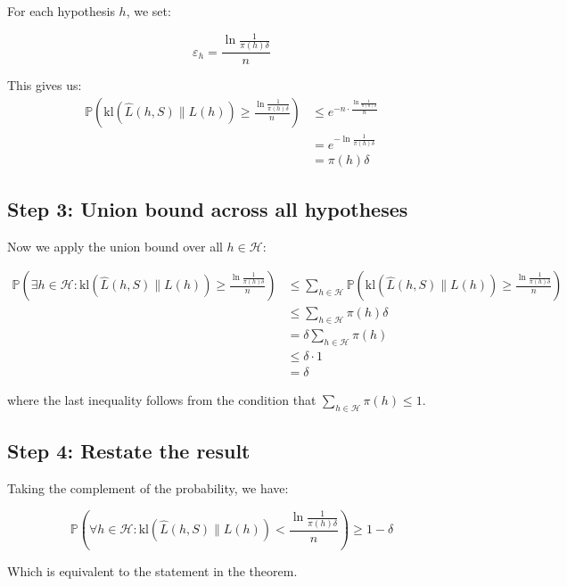 \documentclass{article}
\begin{document}
For each hypothesis $h$, we set:

\begin{equation}
\varepsilon_h = \frac{\ln \frac{1}{\pi(h)\delta}}{n}
\end{equation}

This gives us:
\begin{align}
\mathbb{P}\left(\text{kl}(\hat{L}(h,S)\|L(h)) \geq \frac{\ln \frac{1}{\pi(h)\delta}}{n}\right) &\leq e^{-n \cdot \frac{\ln \frac{1}{\pi(h)\delta}}{n}} \\
&= e^{-\ln \frac{1}{\pi(h)\delta}} \\
&= \pi(h)\delta
\end{align}

\subsection{Step 3: Union bound across all hypotheses}

Now we apply the union bound over all $h \in \mathcal{H}$:

\begin{align}
\mathbb{P}\left(\exists h \in \mathcal{H} : \text{kl}(\hat{L}(h,S)\|L(h)) \geq \frac{\ln \frac{1}{\pi(h)\delta}}{n}\right) &\leq \sum_{h \in \mathcal{H}} \mathbb{P}\left(\text{kl}(\hat{L}(h,S)\|L(h)) \geq \frac{\ln \frac{1}{\pi(h)\delta}}{n}\right) \\
&\leq \sum_{h \in \mathcal{H}} \pi(h)\delta \\
&= \delta \sum_{h \in \mathcal{H}} \pi(h) \\
&\leq \delta \cdot 1 \\
&= \delta
\end{align}

where the last inequality follows from the condition that $\sum_{h \in \mathcal{H}} \pi(h) \leq 1$.

\subsection{Step 4: Restate the result}

Taking the complement of the probability, we have:

\begin{equation}
\mathbb{P}\left(\forall h \in \mathcal{H} : \text{kl}(\hat{L}(h,S)\|L(h)) < \frac{\ln \frac{1}{\pi(h)\delta}}{n}\right) \geq 1 - \delta
\end{equation}

Which is equivalent to the statement in the theorem.
\end{document}
